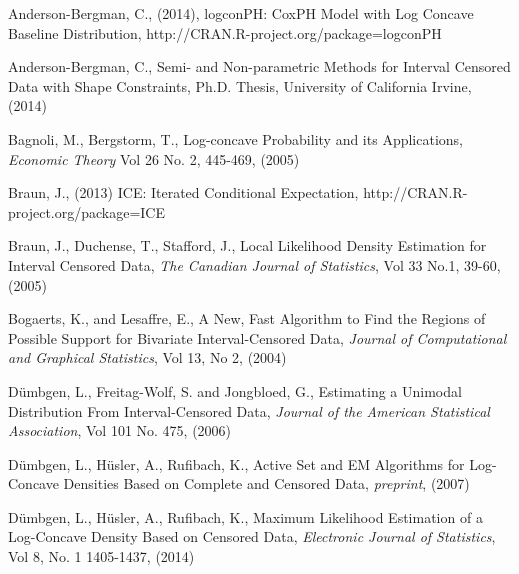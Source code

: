 

\begin{thebibliography}{}
%
%

Anderson-Bergman, C., (2014), logconPH: CoxPH Model with Log Concave Baseline Distribution, http://CRAN.R-project.org/package=logconPH

Anderson-Bergman, C.,  Semi- and Non-parametric Methods for Interval Censored Data with Shape Constraints, Ph.D. Thesis, University of California Irvine, (2014)

Bagnoli, M., Bergstorm, T., Log-concave Probability and its Applications, \emph{Economic Theory} Vol 26 No. 2, 445-469, (2005)

Braun, J., (2013) ICE: Iterated Conditional Expectation, http://CRAN.R-project.org/package=ICE

Braun, J., Duchense, T., Stafford, J., Local Likelihood Density Estimation for Interval Censored Data, \emph{The Canadian Journal of Statistics}, Vol 33 No.1, 39-60, (2005)

Bogaerts, K., and Lesaffre, E., A New, Fast Algorithm to Find the Regions of Possible Support for Bivariate Interval-Censored Data, \emph{Journal of Computational and Graphical Statistics}, Vol 13, No 2, (2004)

D\"umbgen, L., Freitag-Wolf, S. and Jongbloed, G., Estimating a Unimodal Distribution From Interval-Censored Data, \emph{Journal of the American Statistical Association}, Vol 101 No. 475, (2006)

D\"umbgen, L., H\"usler, A., Rufibach, K., Active Set and EM Algorithms for Log-Concave Densities Based on Complete and Censored Data, \emph{preprint}, (2007)

D\"umbgen, L., H\"usler, A., Rufibach, K., Maximum Likelihood Estimation of a Log-Concave Density Based on Censored Data, \emph{Electronic Journal of Statistics}, Vol 8, No. 1 1405-1437, (2014)


\end{thebibliography}
